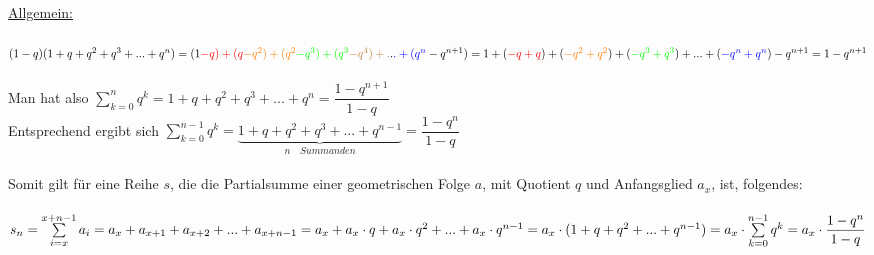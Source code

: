\begin{Beweis}
\underline{Allgemein:}\\
\\
$(1-q)(1+q+q^2+q^3+...+q^n)\\
=(1\textcolor{red}{-q)+(q}\textcolor{orange}{-q^2)+(q^2}\textcolor{green}{-q^3)+(q^3}\textcolor{brown}{-q^4)+.}.\textcolor{blue}{.+(q^n}-q^{n+1})\\
=1+(\textcolor{red}{-q+q})+(\textcolor{orange}{-q^2+q^2})+(\textcolor{green}{-q^3+q^3})+...+(\textcolor{blue}{-q^n+q^n})-q^{n+1}\\
=1-q^{n+1}$\\
\\
Man hat also $\sum\limits_{k=0}^nq^k=1+q+q^2+q^3+...+q^n=\dfrac{1-q^{n+1}}{1-q}$\\
Entsprechend ergibt sich $\sum\limits_{k=0}^{n-1}q^k=\underbrace{1+q+q^2+q^3+...+q^{n-1}}_{n\quad Summanden}=\dfrac{1-q^n}{1-q}$\\
\\
Somit gilt für eine Reihe $s$, die die Partialsumme einer geometrischen Folge $a$, mit Quotient $q$ und Anfangsglied $a_{x}$, ist, folgendes:\\
\\
$s_{n}=\sum\limits_{i=x}^{x+n-1}a_{i}\\
=a_{x}+a_{x+1}+a_{x+2}+...+a_{x+n-1}\\
=a_{x}+a_{x}\cdot q+a_{x}\cdot q^{2}+...+a_{x}\cdot q^{n-1}\\
=a_{x}\cdot(1+q+q^2+...+q^{n-1})\\
=a_{x}\cdot \sum\limits_{k=0}^{n-1}q^k\\
=a_{x}\cdot \dfrac{1-q^{n}}{1-q}$
\end{Beweis}

